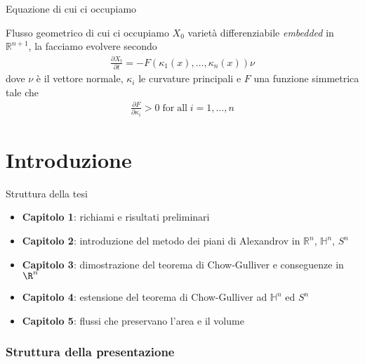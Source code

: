 \begin{frame}{Equazione di cui ci occupiamo}{}
	\begin{block}{Flusso geometrico di cui ci occupiamo}
		$X_0$ varietà differenziabile \textit{embedded} in $\mathbb{R}^{n+1}$, la facciamo evolvere secondo
		\begin{align*}
				\frac{\partial X_t}{\partial t} = - F(\kappa_1(x), \dots , \kappa_n(x)) \nu
		\end{align*}
		dove $\nu$ è il vettore normale, $\kappa_i$ le curvature principali e $F$ una funzione simmetrica tale che 
		\begin{align*}
			\frac{\partial F}{\partial \kappa_i} > 0 \mathrm{\; for \; all } \; i=1,\dots, n
		\end{align*}
	\end{block}
\end{frame}


\section{Introduzione}

\begin{frame}{Struttura della tesi}{}

\begin{itemize}
	\item \textbf{Capitolo 1}: richiami e risultati preliminari 
	\item \textbf{Capitolo 2}: introduzione del metodo dei piani di Alexandrov in $\mathbb{R}^n$, $\mathbb{H}^n$, $S^n$
	\item \textbf{Capitolo 3}: dimostrazione del teorema di Chow-Gulliver e conseguenze in $\R^n$
	\item \textbf{Capitolo 4}: estensione del teorema di Chow-Gulliver ad $\mathbb{H}^n$ ed $S^n$ 
	\item \textbf{Capitolo 5}: flussi che preservano l'area e il volume
\end{itemize}
\end{frame}


\begin{frame}
	\frametitle{Struttura della presentazione}
	\tableofcontents
\end{frame}

